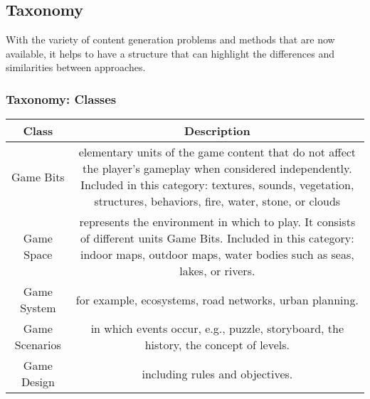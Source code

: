 \documentclass[MGS,Master,english]{twbook}%
\begin{document}
\subsection{Taxonomy}
With the variety of content generation problems and methods that are now available, it helps to have a structure that can highlight the differences and similarities between approaches. \cite{pcg::book}
\subsubsection{Taxonomy: Classes}
\cite{pcg::survey}
\begin{table}[!htbp]
	\centering
	\resizebox{\textwidth}{!}
	{%
		\begin{tabular}{|c|c|}
			\hline 
			\textbf{Class} & \textbf{Description} \\ 
			\hline 
			Game Bits & elementary units of the game content that do not affect the
			player’s gameplay when considered independently. Included in this category:
			textures, sounds, vegetation, structures, behaviors, fire, water, stone, or clouds \\ 
			\hline 
			Game Space & represents the environment in which to play. It consists of different
			units Game Bits. Included in this category: indoor maps, outdoor maps, water
			bodies such as seas, lakes, or rivers. \\ 
			\hline 
			Game System & for example, ecosystems, road networks, urban planning. \\ 
			\hline 
			Game Scenarios & in which events occur, e.g., puzzle, storyboard, the history,
			the concept of levels. \\ 
			\hline 
			Game Design & including rules and objectives. \\ 
			\hline 
		\end{tabular} 
	}
\end{table}
\end{document}
